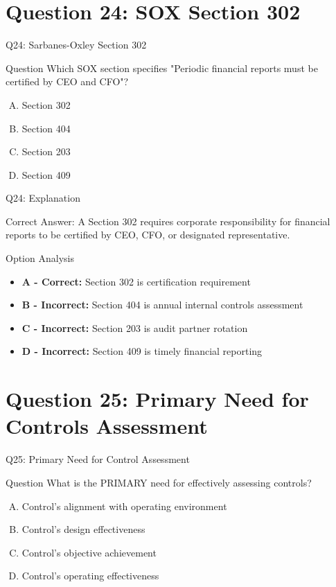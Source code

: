 \documentclass{beamer}
\begin{document}
	\section{Question 24: SOX Section 302}
	
	\begin{frame}{Q24: Sarbanes-Oxley Section 302}
		\begin{block}{Question}
			Which SOX section specifies "Periodic financial reports must be certified by CEO and CFO"?
		\end{block}
		\begin{enumerate}[(A)]
			\item Section 302
			\item Section 404
			\item Section 203
			\item Section 409
		\end{enumerate}
	\end{frame}
	
	\begin{frame}{Q24: Explanation}
		\begin{block}{Correct Answer: A}
			Section 302 requires corporate responsibility for financial reports to be certified by CEO, CFO, or designated representative.
		\end{block}
		\begin{block}{Option Analysis}
			\begin{itemize}
				\item \textbf{A - Correct:} Section 302 is certification requirement
				\item \textbf{B - Incorrect:} Section 404 is annual internal controls assessment
				\item \textbf{C - Incorrect:} Section 203 is audit partner rotation
				\item \textbf{D - Incorrect:} Section 409 is timely financial reporting
			\end{itemize}
		\end{block}
	\end{frame}
	
	\section{Question 25: Primary Need for Controls Assessment}
	
	\begin{frame}{Q25: Primary Need for Control Assessment}
		\begin{block}{Question}
			What is the PRIMARY need for effectively assessing controls?
		\end{block}
		\begin{enumerate}[(A)]
			\item Control's alignment with operating environment
			\item Control's design effectiveness
			\item Control's objective achievement
			\item Control's operating effectiveness
		\end{enumerate}
	\end{frame}
	
\end{document}

